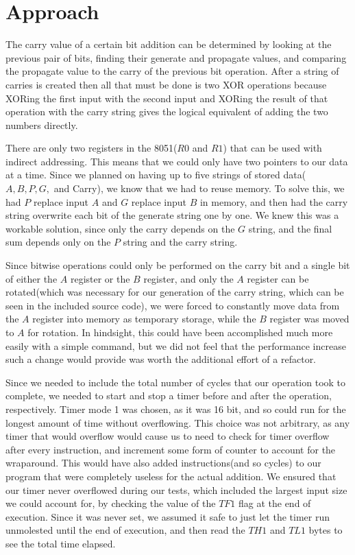 \documentclass{article}
\begin{document}
\pagebreak

\section{Approach}\label{sec:approach}
The carry value of a certain bit addition
can be determined by looking at the previous
pair of bits, finding their generate and propagate values, and comparing the
propagate value to the carry of the previous bit operation. After a string of
carries is created then all that must be done is two XOR operations because
XORing the first input with the second input and XORing the result of that
operation with the carry string gives the logical equivalent of adding the two
numbers directly.

There are only two registers in the 8051($R0$ and $R1$) that can be used with
indirect addressing. This means that we could only have two pointers to our data
at a time. Since we planned on having up to five strings of stored
data($A, B, P, G,$ and Carry), we know that we had to reuse memory. To solve this,
we had $P$ replace input $A$ and $G$ replace input $B$ in memory, and then had the
carry string overwrite each bit of the generate string one by one. We knew this
was a workable solution, since only the carry depends on the $G$ string, and the
final sum depends only on the $P$ string and the carry string.

Since bitwise operations could only be performed on the carry bit and a single
bit of either the $A$ register or the $B$ register, and only the $A$ register
can be rotated(which was necessary for our generation of the carry string,
which can be seen in the included source code), we were forced to constantly
move data from the $A$ register into memory as temporary storage, while the $B$
register was moved to $A$ for rotation. In hindsight, this could have been
accomplished much more easily with a simple  command, but we did
not feel that the performance increase such a change would provide was worth the
additional effort of a refactor.

Since we needed to include the total number of cycles that our operation took
to complete, we needed to start and stop a timer before and after the operation,
respectively. Timer mode 1 was chosen, as it was 16 bit, and so could run for
the longest amount of time without overflowing. This choice was not arbitrary,
as any timer that would overflow would cause us to need to check for timer
overflow after every instruction, and increment some form of counter to account
for the wraparound. This would have also added instructions(and so cycles)
to our program that were completely useless for the actual addition. We ensured
that our timer never overflowed during our tests, which included the largest
input size we could account for, by checking the value of the $TF1$ flag at the
end of execution. Since it was never set, we assumed it safe to just let the
timer run unmolested until the end of execution, and then read the $TH1$ and
$TL1$ bytes to see the total time elapsed.
\end{document}
